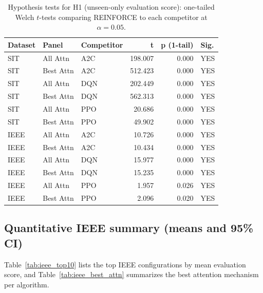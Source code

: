 \documentclass[sn-basic]{sn-jnl} %
\begin{document}
\begin{table}[t]
        \centering
        \caption{Hypothesis tests for H1 (unseen-only evaluation score): one-tailed Welch $t$-tests comparing REINFORCE to each competitor at $\alpha=0.05$.}
        \label{tab:hyp_tests}
        \begin{tabular}{l l l r r l}
        \toprule
        \textbf{Dataset} & \textbf{Panel} & \textbf{Competitor} & \textbf{t} & \textbf{p (1-tail)} & \textbf{Sig.}\\
        \midrule
        SIT & All Attn & A2C & 198.007 & 0.000 & YES\\
        SIT & Best Attn & A2C & 512.423 & 0.000 & YES\\
        SIT & All Attn & DQN & 202.449 & 0.000 & YES\\
        SIT & Best Attn & DQN & 562.313 & 0.000 & YES\\
        SIT & All Attn & PPO & 20.686 & 0.000 & YES\\
        SIT & Best Attn & PPO & 49.902 & 0.000 & YES\\
        IEEE & All Attn & A2C & 10.726 & 0.000 & YES\\
        IEEE & Best Attn & A2C & 10.434 & 0.000 & YES\\
        IEEE & All Attn & DQN & 15.977 & 0.000 & YES\\
        IEEE & Best Attn & DQN & 15.235 & 0.000 & YES\\
        IEEE & All Attn & PPO & 1.957 & 0.026 & YES\\
        IEEE & Best Attn & PPO & 2.096 & 0.020 & YES\\
        \bottomrule
        \end{tabular}
\end{table}

\subsection{Quantitative IEEE summary (means and 95\% CI)}
\label{sec:ieee_summary}
Table~\ref{tab:ieee_top10} lists the top IEEE configurations by mean evaluation score, and Table~\ref{tab:ieee_best_attn} summarizes the best attention mechanism per algorithm.
\end{document}
